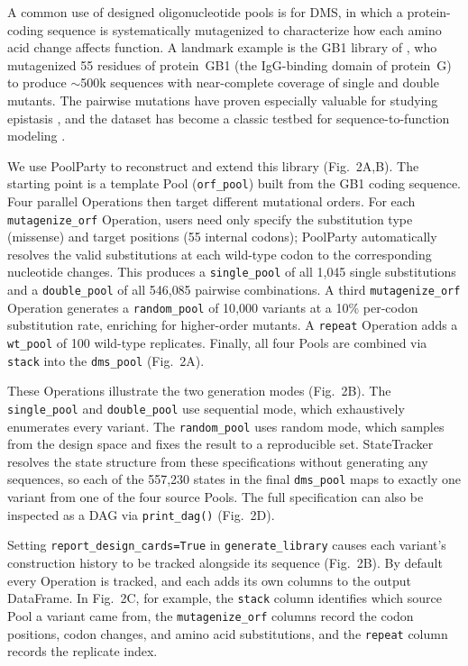 \documentclass[unnumsec,webpdf,modern,large]{mam-authoring-template}%
\theoremstyle{thmstyleone}%
\theoremstyle{thmstyletwo}%
\theoremstyle{thmstylethree}%
\begin{document}
A common use of designed oligonucleotide pools is for DMS, in which a protein-coding sequence is systematically mutagenized to characterize how each amino acid change affects function. A landmark example is the GB1 library of \citet{Olson2014iq}, who mutagenized 55 residues of protein~GB1 (the IgG-binding domain of protein~G) to produce ${\sim}$500k sequences with near-complete coverage of single and double mutants. The pairwise mutations have proven especially valuable for studying epistasis \citep{Zhou2022ho}, and the dataset has become a classic testbed for sequence-to-function modeling \citep{Tareen2022dh,Faure2024mn}.

We use PoolParty to reconstruct and extend this library (Fig.~2A,B). The starting point is a template Pool (\texttt{orf\_pool}) built from the GB1 coding sequence. Four parallel Operations then target different mutational orders. For each \texttt{mutagenize\_orf} Operation, users need only specify the substitution type (missense) and target positions (55 internal codons); PoolParty automatically resolves the valid substitutions at each wild-type codon to the corresponding nucleotide changes. This produces a \texttt{single\_pool} of all 1{,}045 single substitutions and a \texttt{double\_pool} of all 546{,}085 pairwise combinations. A third \texttt{mutagenize\_orf} Operation generates a \texttt{random\_pool} of 10{,}000 variants at a 10\% per-codon substitution rate, enriching for higher-order mutants. A \texttt{repeat} Operation adds a \texttt{wt\_pool} of 100 wild-type replicates. Finally, all four Pools are combined via \texttt{stack} into the \texttt{dms\_pool} (Fig.~2A).

These Operations illustrate the two generation modes (Fig.~2B). The \texttt{single\_pool} and \texttt{double\_pool} use sequential mode, which exhaustively enumerates every variant. The \texttt{random\_pool} uses random mode, which samples from the design space and fixes the result to a reproducible set. StateTracker resolves the state structure from these specifications without generating any sequences, so each of the 557{,}230 states in the final \texttt{dms\_pool} maps to exactly one variant from one of the four source Pools. The full specification can also be inspected as a DAG via \texttt{print\_dag()} (Fig.~2D).

Setting \texttt{report\_design\_cards=True} in \texttt{generate\_library} causes each variant's construction history to be tracked alongside its sequence (Fig.~2B). By default every Operation is tracked, and each adds its own columns to the output DataFrame. In Fig.~2C, for example, the \texttt{stack} column identifies which source Pool a variant came from, the \texttt{mutagenize\_orf} columns record the codon positions, codon changes, and amino acid substitutions, and the \texttt{repeat} column records the replicate index.
\end{document}
